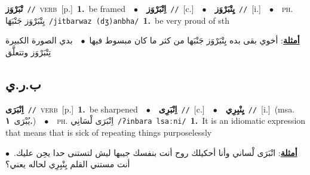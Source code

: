 \documentclass[10pt,a4paper,twoside]{article} %
\begin{document}
\begin{multicols}{2}
{\setlength\topsep{0pt}\textbf{\foreignlanguage{arabic}{تْبَرْوَز}}\ {\color{gray}\texttt{//}\color{black}}\ \textsc{verb}\ [p.]\ \textbf{1.}~be framed\ \ $\bullet$\ \ \setlength\topsep{0pt}\textbf{\foreignlanguage{arabic}{اِتْبَرْوَز}}\ {\color{gray}\texttt{//}\color{black}}\ [c.]\ \ $\bullet$\ \ \setlength\topsep{0pt}\textbf{\foreignlanguage{arabic}{يِتْبَرْوَز}}\ {\color{gray}\texttt{//}\color{black}}\ [i.]\ \ $\bullet$\ \ \textsc{ph.} \color{gray} \foreignlanguage{arabic}{يِتْبَرْوَز جَنْبَهَا}\color{black}\ {\color{gray}\texttt{/{\sffamily jitbarwaz (dʒ)anbha}/}\color{black}}\ \textbf{1.}~be very proud of sth\  \begin{flushright}\color{gray}\foreignlanguage{arabic}{\textbf{\underline{\foreignlanguage{arabic}{أمثلة}}}: أخوي بقى بده يِتْبَرْوَز جَنْبَها من كثر ما كان مبسوط فيها\ $\bullet$\ \  بدي الصورة الكبيرة تِتْبَرْوَز وتتعلَّق}\end{flushright}\color{black}} \vspace{2mm}

\vspace{-3mm}
\subsection*{\color{blue}\foreignlanguage{arabic}{ب.ر.ي}\color{blue}{}} 

{\setlength\topsep{0pt}\textbf{\foreignlanguage{arabic}{اِنْبَرَى}}\ {\color{gray}\texttt{//}\color{black}}\ \textsc{verb}\ [p.]\ \textbf{1.}~be sharpened\ \ $\bullet$\ \ \setlength\topsep{0pt}\textbf{\foreignlanguage{arabic}{اِنْبَرِى}}\ {\color{gray}\texttt{//}\color{black}}\ [c.]\ \ $\bullet$\ \ \setlength\topsep{0pt}\textbf{\foreignlanguage{arabic}{يِنْبِرِي}}\ {\color{gray}\texttt{//}\color{black}}\ [i.]\ \color{gray}(msa. \foreignlanguage{arabic}{يُبْرَى}~\foreignlanguage{arabic}{\textbf{١.}})\color{black}\ \ $\bullet$\ \ \textsc{ph.} \color{gray} \foreignlanguage{arabic}{اِنْبَرَى لْسَانِي}\color{black}\ {\color{gray}\texttt{/{\sffamily ʔinbara lsaːni}/}\color{black}}\ \textbf{1.}~It is an idiomatic expression that means that is sick of repeating things purposelessly\  \begin{flushright}\color{gray}\foreignlanguage{arabic}{\textbf{\underline{\foreignlanguage{arabic}{أمثلة}}}: انْبَرَى لْساني وأنا أحكيلك روح أنت بنفسك جيبها ليش لتستنى حدا يحِن عليك.\ $\bullet$\ \  أنت مستني القلم يِنْبِرِي لحاله يعني؟}\end{flushright}\color{black}} \vspace{2mm}


\end{multicols}
\end{document}
